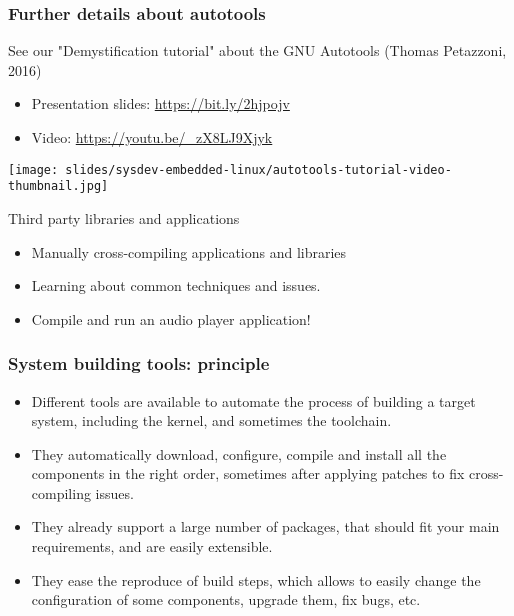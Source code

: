 \begin{frame}
  \frametitle{Further details about autotools}
  See our "Demystification tutorial" about the GNU Autotools (Thomas Petazzoni, 2016)
  \begin{itemize}
     \item Presentation slides: \url{https://bit.ly/2hjpojv}
     \item Video: \url{https://youtu.be/_zX8LJ9Xjyk}
  \end{itemize}
  \vfill
  \texttt{[image: slides/sysdev-embedded-linux/autotools-tutorial-video-thumbnail.jpg]}
\end{frame}

\setuplabframe
{Third party libraries and applications}
{
  \begin{itemize}
  \item Manually cross-compiling applications and libraries
  \item Learning about common techniques and issues.
  \item Compile and run an audio player application!
  \end{itemize}
}

\begin{frame}
  \frametitle{System building tools: principle}
  \begin{itemize}
  \item Different tools are available to automate the process of
    building a target system, including the kernel, and sometimes the
    toolchain.
  \item They automatically download, configure, compile and install
    all the components in the right order, sometimes after applying
    patches to fix cross-compiling issues.
  \item They already support a large number of packages, that should
    fit your main requirements, and are easily extensible.
  \item They ease the reproduce of build steps, which allows to easily change
    the configuration of some components, upgrade them, fix bugs, etc.
  \end{itemize}
\end{frame}

